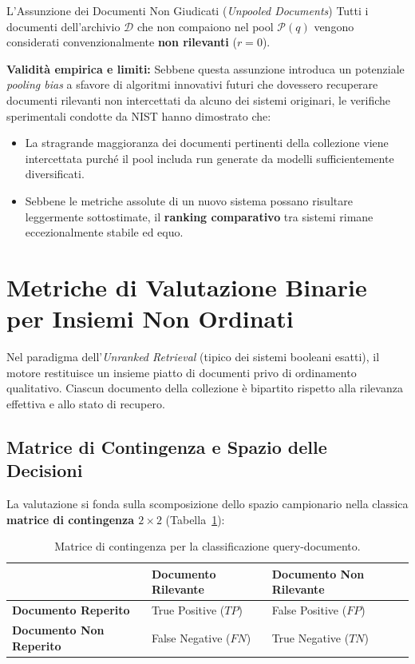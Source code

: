 \begin{alertblock}{L'Assunzione dei Documenti Non Giudicati (\textit{Unpooled Documents})}
Tutti i documenti dell'archivio $\mathcal{D}$ che non compaiono nel pool $\mathcal{P}(q)$ vengono considerati convenzionalmente \textbf{non rilevanti} ($r = 0$).

\textbf{Validit\`a empirica e limiti:}
Sebbene questa assunzione introduca un potenziale \textit{pooling bias} a sfavore di algoritmi innovativi futuri che dovessero recuperare documenti rilevanti non intercettati da alcuno dei sistemi originari, le verifiche sperimentali condotte da NIST hanno dimostrato che:
\begin{itemize}
    \item La stragrande maggioranza dei documenti pertinenti della collezione viene intercettata purché il pool includa run generate da modelli sufficientemente diversificati.
    \item Sebbene le metriche assolute di un nuovo sistema possano risultare leggermente sottostimate, il \textbf{ranking comparativo} tra sistemi rimane eccezionalmente stabile ed equo.
\end{itemize}
\end{alertblock}

\FloatBarrier
\section{Metriche di Valutazione Binarie per Insiemi Non Ordinati}
\label{sec:metriche-binarie-non-ordinate}

Nel paradigma dell'\textit{Unranked Retrieval} (tipico dei sistemi booleani esatti), il motore restituisce un insieme piatto di documenti privo di ordinamento qualitativo. Ciascun documento della collezione \`e bipartito rispetto alla rilevanza effettiva e allo stato di recupero.

\FloatBarrier
\subsection{Matrice di Contingenza e Spazio delle Decisioni}
\label{subsec:matrice-contingenza}

La valutazione si fonda sulla scomposizione dello spazio campionario nella classica \textbf{matrice di contingenza $2 \times 2$} (Tabella~\ref{tab:contingency-evaluation}):

\begin{table}[H]
\centering
\small
\begin{tabularx}{0.88\columnwidth}{l >{\centering\arraybackslash}X >{\centering\arraybackslash}X}
\toprule
& \textbf{Documento Rilevante} & \textbf{Documento Non Rilevante} \\
\midrule
\textbf{Documento Reperito} & True Positive ($TP$) & False Positive ($FP$) \\
\addlinespace
\textbf{Documento Non Reperito} & False Negative ($FN$) & True Negative ($TN$) \\
\bottomrule
\end{tabularx}
\caption{Matrice di contingenza per la classificazione query-documento.}
\label{tab:contingency-evaluation}
\end{table}

